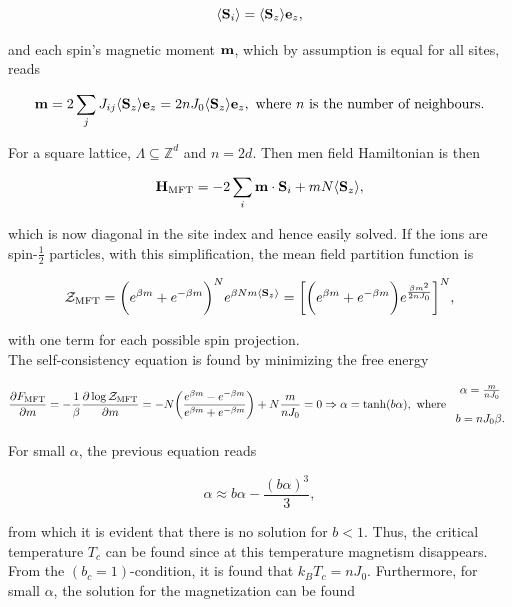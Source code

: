 $$
    \langle {\bf S}_i \rangle = \langle {\bf S}_z \rangle {\bf e}_z,
$$

and each spin's magnetic moment ${\bf m}$, which by assumption is equal for all sites, reads

$$
    {\bf m} = 2 \sum_{j} J_{ij} \langle {\bf S}_z \rangle {\bf e}_z = 2n J_0 \langle {\bf S}_z \rangle {\bf e}_z, \textnormal{ where $n$ is the number of neighbours}. 
$$

For a square lattice, $\Lambda \subseteq \mathds{Z}^d$ and $n = 2d$. Then men field Hamiltonian is then

$$
    {\bf H}_{\textnormal{MFT}} = - 2 \sum_{i} {\bf m} \cdot {\bf S}_i + m N \langle {\bf S}_z \rangle,
$$

which is now diagonal in the site index and hence easily solved. If the ions are spin-$\frac{1}{2}$ particles, with this simplification, the mean field partition function is 

$$
    {\mathcal{Z}_{\textnormal{MFT}}} = \bigg( e^{\beta m} + e^{-\beta m} \bigg)^N e^{\beta N m \langle {\bf S}_z \rangle} = \bigg[ \bigg( e^{\beta m} + e^{-\beta m} \bigg) e^{\frac{\beta m^2}{2n J_0}} \bigg]^N,
$$

with one term for each possible spin projection. \\

The self-consistency equation is found by minimizing the free energy 

$$
    \frac{\partial F_{\textnormal{MFT}}}{\partial m} = - \frac{1}{\beta} \frac{\partial \log  {\mathcal{Z}_{\textnormal{MFT}}}}{\partial m} = -N \bigg(\frac{e^{\beta m} - e^{-\beta m}}{e^{\beta m} + e^{-\beta m}}\bigg) + N \frac{m}{n J_0} = 0 \Rightarrow \alpha = \tanh(b \alpha), \textnormal{ where } \begin{array}{c}
        \alpha = \frac{m}{nJ_0}  \\
        \\
        b = nJ_0 \beta.  
    \end{array}
$$

For small $\alpha$, the previous equation reads

$$
\alpha \approx b \alpha - \frac{(b\alpha)^3}{3},
$$

from which it is evident that there is no solution for $b < 1$. Thus, the critical temperature $T_c$ can be found since at this temperature magnetism disappears. From the $(b_c = 1)$-condition, it is found that $k_B T_c = n J_0$. Furthermore, for small $\alpha$, the solution for the magnetization can be found 


